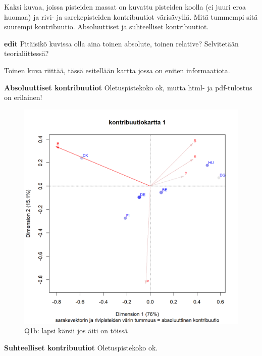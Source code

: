 \documentclass[
  finnish,
]{book}
\begin{document}
Kaksi kuvaa, joissa pisteiden massat on kuvattu pisteiden koolla (ei juuri eroa
huomaa) ja rivi- ja sarekepisteiden kontribuutiot värisävyllä. Mitä tummempi sitä
suurempi kontribuutio. Absoluuttiset ja suhteelliset kontribuutiot.

\textbf{edit} Pitäisikö kuvissa olla aina toinen absolute, toinen relative? Selvitetään
teorialiittessä?

Toinen kuva riittää, tässä esitellään kartta jossa on eniten informaatiota.

\textbf{Absoluuttiset kontribuutiot} Oletuspistekoko ok, mutta html- ja pdf-tulostus
on erilainen!

\begin{figure}

{\centering \includegraphics[width=0.9\linewidth]{JH_capaper_files/figure-latex/G1-3asymmContrib1-1} 

}

\caption{Q1b: lapsi kärsii jos äiti on töissä}\label{fig:G1-3asymmContrib1}
\end{figure}

\textbf{Suhteelliset kontribuutiot} Oletuspistekoko ok.
\end{document}

